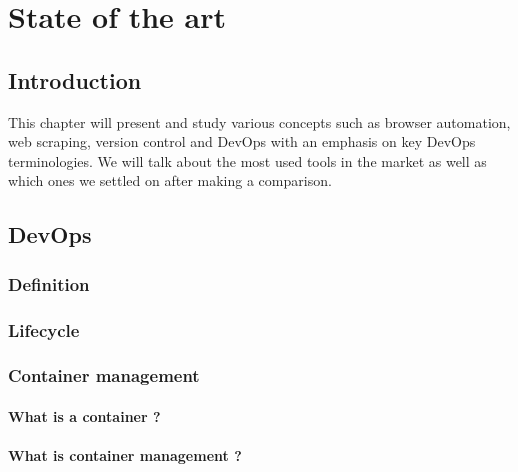 \chapter{State of the art}
\minitoc
\newpage

\setcounter{secnumdepth}{0} %
\section{Introduction}
This chapter will present and study various concepts such as browser automation, web scraping, version control and DevOps with an emphasis on key DevOps terminologies.
We will talk about the most used tools in the market as well as which ones we settled on after making a comparison.

\setcounter{secnumdepth}{2} %
\section{DevOps}

\subsection{Definition}
\lipsum[2][1]

\subsection{Lifecycle}
\lipsum[2][1]

\subsection{Container management}
\lipsum[2][1]

\subsubsection*{What is a container ?}
\lipsum[2][1]

\subsubsection*{What is container management ?}
\lipsum[2][1]

